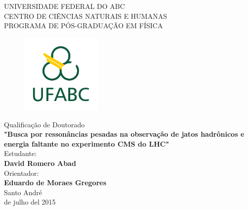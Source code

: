 \begin{titlepage}

\noindent  UNIVERSIDADE FEDERAL DO ABC \\
\noindent  CENTRO DE CIÊNCIAS NATURAIS E HUMANAS\\
\noindent  PROGRAMA DE PÓS-GRADUAÇÃO EM  FÍSICA\\


\begin{figure}[htb]
\begin{center}
\includegraphics[width=4cm]{Titlefig/logo}
\end{center}
\end{figure}



\begin{center}
\noindent \Large Qualificação de Doutorado\\
\vspace*{0.5cm}
\noindent \Large \textbf{"Busca por ressonâncias pesadas na observação de jatos hadrônicos e energia faltante no experimento CMS do LHC"}\\
\vspace*{0.5cm}
\noindent   Estudante: \\
\vspace*{0.5cm}
\noindent \Large \textbf{David Romero Abad} \\
\vspace*{0.5cm}
\noindent  Orientador:   \\
\vspace*{0.5cm}
\noindent \Large  \textbf{Eduardo de Moraes Gregores}\\
\vspace*{0.5cm}
\noindent   Santo André \\
\vspace*{0.5cm}
 de julho del 2015 \\
\end{center}
\end{titlepage}
\titlepage

\newpage
$\ $
\thispagestyle{empty}
